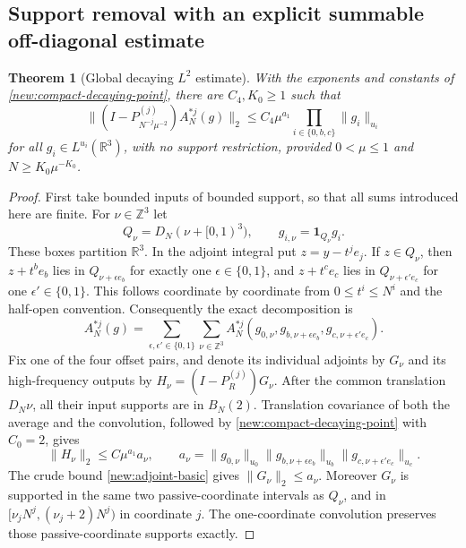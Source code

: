 \documentclass[11pt]{article}
\newtheorem{theorem}{Theorem}[section]
\theoremstyle{definition}
\newcommand{\one}{\mathbf 1}
\newcommand{\R}{\mathbb R}
\begin{document}
\subsection{Support removal with an explicit summable off-diagonal estimate}
\begin{theorem}[Global decaying $L^2$ estimate]\label{new:global-decaying-point}
With the exponents and constants of \cref{new:compact-decaying-point}, there are
$C_4,K_0\geq1$ such that
\[
 \|(I-P_{N^{-j}\mu^{-2}}^{(j)})A_N^{*j}(g)\|_2
 \leq C_4\mu^{a_1}\prod_{i\in\{0,b,c\}}\|g_i\|_{u_i}
\]
for all $g_i\in L^{u_i}(\R^3)$, with no support restriction, provided
$0<\mu\leq1$ and $N\geq K_0\mu^{-K_0}$.
\end{theorem}
\begin{proof}
First take bounded inputs of bounded support, so that all sums introduced here are finite.
For $\nu\in\mathbb Z^3$ let
\[
 Q_\nu=D_N(\nu+[0,1)^3),\qquad g_{i,\nu}=\one_{Q_\nu}g_i.
\]
These boxes partition $\R^3$. In the adjoint integral put $z=y-t^je_j$. If $z\in Q_\nu$,
then $z+t^be_b$ lies in $Q_{\nu+\epsilon e_b}$ for exactly one $\epsilon\in\{0,1\}$,
and $z+t^ce_c$ lies in $Q_{\nu+\epsilon'e_c}$ for one $\epsilon'\in\{0,1\}$.
This follows coordinate by coordinate from $0\leq t^i\leq N^i$ and the half-open convention.
Consequently the exact decomposition is
\[
 A_N^{*j}(g)=\sum_{\epsilon,\epsilon'\in\{0,1\}}\sum_{\nu\in\mathbb Z^3}
 A_N^{*j}(g_{0,\nu},g_{b,\nu+\epsilon e_b},g_{c,\nu+\epsilon'e_c}).
\]
Fix one of the four offset pairs, and denote its individual adjoints by $G_\nu$ and its
high-frequency outputs by $H_\nu=(I-P_R^{(j)})G_\nu$.
After the common translation $D_N\nu$, all their input supports are in $B_N(2)$.
Translation covariance of both the average and the convolution, followed by
\cref{new:compact-decaying-point} with $C_0=2$, gives
\[
 \|H_\nu\|_2\leq C\mu^{a_1}a_\nu,
 \qquad
 a_\nu=\|g_{0,\nu}\|_{u_0}\|g_{b,\nu+\epsilon e_b}\|_{u_b}
                       \|g_{c,\nu+\epsilon'e_c}\|_{u_c}.
\]
The crude bound \cref{new:adjoint-basic} gives $\|G_\nu\|_2\leq a_\nu$.
Moreover $G_\nu$ is supported in the same two passive-coordinate intervals as $Q_\nu$, and
in $[\nu_jN^j,(\nu_j+2)N^j)$ in coordinate $j$. The one-coordinate convolution preserves
those passive-coordinate supports exactly.


\end{proof}
\end{document}
